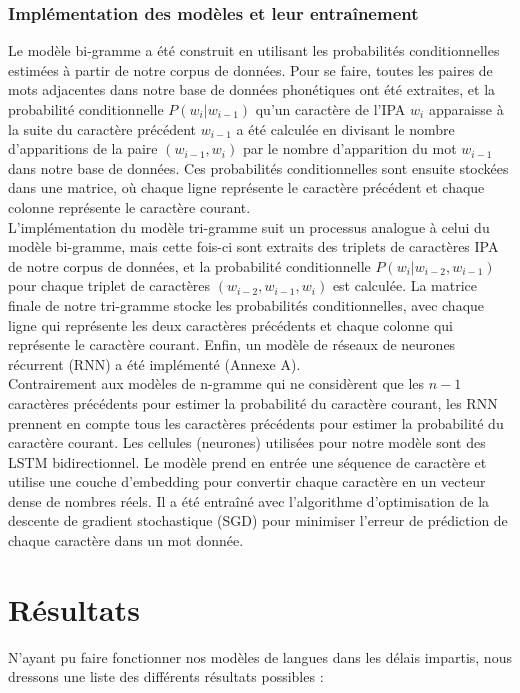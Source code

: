 \documentclass[10pt, french]{article}
\begin{document}
\begin{multicols*}{2}
\subsubsection{Implémentation des modèles et leur entraînement}
Le modèle bi-gramme a été construit en utilisant les probabilités conditionnelles estimées à partir de notre corpus de données. Pour se faire, toutes les paires de mots adjacentes dans notre base de données phonétiques ont été extraites, et la probabilité conditionnelle $P(w_i|w_{i-1})$ qu'un caractère de l'IPA $w_i$ apparaisse à la suite du caractère précédent $w_{i-1}$ a été calculée en divisant le nombre d'apparitions de la paire $(w_{i-1},w_i)$ par le nombre d'apparition du mot $w_{i-1}$ dans notre base de données. Ces probabilités conditionnelles sont ensuite stockées dans une matrice, où chaque ligne représente le caractère précédent et chaque colonne représente le caractère courant.\\
\indent L'implémentation du modèle tri-gramme suit un processus analogue à celui du modèle bi-gramme, mais cette fois-ci sont extraits des triplets de caractères IPA de notre corpus de données, et la probabilité conditionnelle $P(w_i|w_{i-2},w_{i-1})$ pour chaque triplet de caractères $(w_{i-2},w_{i-1},w_i)$ est calculée. La matrice finale de notre tri-gramme stocke les probabilités conditionnelles, avec chaque ligne qui représente les deux caractères précédents et chaque colonne qui représente le caractère courant.
Enfin, un modèle de réseaux de neurones récurrent (RNN) a été implémenté (Annexe A).\\
\indent Contrairement aux modèles de n-gramme qui ne considèrent que les $n-1$ caractères précédents 
pour estimer la probabilité du caractère courant, les RNN prennent en compte tous les caractères précédents 
pour estimer la probabilité du caractère courant. Les cellules (neurones) utilisées pour notre modèle sont 
des LSTM bidirectionnel. Le modèle prend en entrée une séquence de caractère et utilise une couche d'embedding 
pour convertir chaque caractère en un vecteur dense de nombres réels. Il a été entraîné avec l'algorithme 
d'optimisation de la descente de gradient stochastique (SGD) pour minimiser l'erreur de prédiction de 
chaque caractère dans un mot donnée.

\section{Résultats}

N'ayant pu faire fonctionner nos modèles de langues dans les délais impartis, nous dressons une liste des différents résultats possibles : 


\end{multicols*}
\end{document}
